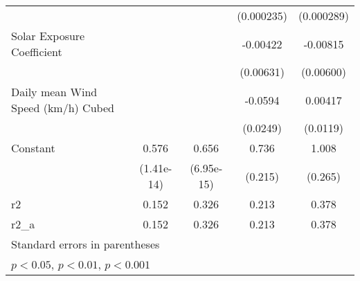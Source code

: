 {\begin{tabular}{l*{4}{c}}
                    &                     &                     &  (0.000235)         &  (0.000289)         \\
[1em]
Solar Exposure Coefficient&                     &                     &    -0.00422         &    -0.00815         \\
                    &                     &                     &   (0.00631)         &   (0.00600)         \\
[1em]
Daily mean Wind Speed (km/h) Cubed&                     &                     &     -0.0594         &     0.00417         \\
                    &                     &                     &    (0.0249)         &    (0.0119)         \\
[1em]
Constant            &       0.576\sym{***}&       0.656\sym{***}&       0.736\sym{*}  &       1.008\sym{*}  \\
                    &  (1.41e-14)         &  (6.95e-15)         &     (0.215)         &     (0.265)         \\
\hline
r2                  &       0.152         &       0.326         &       0.213         &       0.378         \\
r2\_a                &       0.152         &       0.326         &       0.213         &       0.378         \\
\hline\hline
\multicolumn{5}{l}{\footnotesize Standard errors in parentheses}\\
\multicolumn{5}{l}{\footnotesize \sym{*} \(p<0.05\), \sym{**} \(p<0.01\), \sym{***} \(p<0.001\)}\\
\end{tabular}
}
